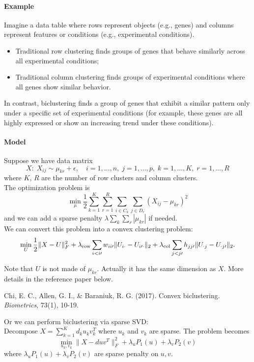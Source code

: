 \documentclass[12pt]{book}
\theoremstyle{definition}
\theoremstyle{remark}
\begin{document}
\paragraph{Example} 
Imagine a data table where rows represent objects (e.g., genes) and columns represent features or conditions (e.g., experimental conditions).\\
\begin{itemize}
    \item Traditional row clustering finds groups of genes that behave similarly across all experimental conditions;
    \item Traditional column clustering finds groups of experimental conditions where all genes show similar behavior.
\end{itemize}

In contrast, biclustering finds a group of genes that exhibit a similar pattern only under a specific set of experimental conditions (for example, these genes are all highly expressed or show an increasing trend under these conditions).

\paragraph{Model}
Suppose we have data matrix \[X: \; X_{ij} \sim \mu_{kr} + \epsilon, \quad i= 1,\dots, n,\;j = 1,\dots, p,\; k = 1,\dots,K,\; r = 1,\dots, R\] where $K$, $R$ are the number of row clusters and column clusters. \\
The optimization problem is 
\[\min_{\mu} \frac12\sum_{k=1}^K\sum_{r=1}^R \sum_{i\in C_k} \sum_{j \in D_r}(X_{ij} - \mu_{kr})^2\]
and we can add a sparse penalty $\lambda\sum_{k}\sum_{r}|\mu_{kr}|$ if needed.\\

We can convert this problem into a convex clustering problem:
\[\min_{U}\frac12\|X-U\|_F^2 + \lambda_{\rm row} \sum_{i<i{\prime}}w_{ii{\prime}}\|U_{i\cdot}-U_{i{\prime}\cdot}\|_2
+\lambda_{\rm col}\sum_{j<j{\prime}}h_{jj{\prime}}\|U_{\cdot j}-U_{\cdot j{\prime}}\|_2.\]

Note that $U$ is not made of $\mu_{kr}$. Actually it has the same dimension as $X$. More details in the reference paper below.
\begin{referencebox}
    Chi, E. C., Allen, G. I., \& Baraniuk, R. G. (2017). Convex biclustering. \textit{Biometrics}, 73(1), 10-19.
\end{referencebox}

Or we can perform biclustering via sparse SVD:\\
Decompose $X = \sum_{k=1}^K d_ku_kv_k^T$ where $u_k$ and $v_k$ are sparse. The problem becomes 
\[\min_{u_k,v_k} \|X - duv^T\|_F^2 + \lambda_uP_1(u) + \lambda_vP_2(v)\]
where $\lambda_uP_1(u) + \lambda_vP_2(v)$ are sparse penalty on $u,v$.
\end{document}
